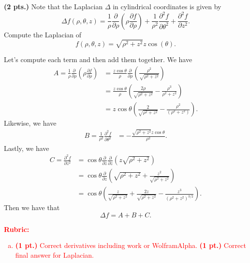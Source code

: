 \documentclass[12pt]{article} %
\begin{document}
\newpage
\begin{problem}
	\textbf{(2 pts.)} Note that the Laplacian $\Delta$ in cylindrical coordinates is given by
	\[
	\Delta f(\rho,\theta,z) = \frac{1}{\rho} \frac{\partial}{\partial \rho} \left(\rho \frac{\partial f}{\partial \rho}\right)+\frac{1}{\rho^2}\frac{\partial^2 f}{\partial \theta^2} + \frac{\partial^2 f}{\partial z^2}.
	\]
	Compute the Laplacian of
	\[
	f(\rho,\theta,z) = \sqrt{\rho^2+z^2} z \cos(\theta).
	\]
\end{problem}
\begin{solution}
Let's compute each term and then add them together. We have
\begin{align*}
    A=\frac{1}{\rho}\frac{\partial}{\partial \rho} \left(\rho \frac{\partial f}{\partial \rho} \right) &=  \frac{z\cos \theta}{\rho} \frac{\partial}{\partial \rho} \left( \frac{\rho^2}{\sqrt{\rho^2+z^2}} \right)\\
    &=\frac{z\cos \theta}{\rho} \left(\frac{2\rho}{\sqrt{\rho^2+z^2}}-\frac{\rho^3}{\rho^2+z^2}\right)\\
    &= z\cos \theta \left( \frac{2}{\sqrt{\rho^2+z^2}} - \frac{\rho^2}{\left(\rho^2+z^2\right)}\right).
\end{align*}
Likewise, we have
\begin{align*}
    B=\frac{1}{\rho^2} \frac{\partial^2 f}{\partial \theta^2} &= -\frac{\sqrt{\rho^2+z^2}z\cos\theta}{\rho^2}.
\end{align*}  
Lastly, we have
\begin{align*}
    C=\frac{\partial^2 f}{\partial z^2} &= \cos \theta \frac{\partial}{\partial z}\frac{\partial}{\partial z} \left( z \sqrt{\rho^2+z^2}\right)\\
    &= \cos \theta \frac{\partial}{\partial z} \left( \sqrt{\rho^2+z^2}+ \frac{z^2}{\sqrt{\rho^2+z^2}}\right)\\
    &= \cos \theta \left(\frac{z}{\sqrt{\rho^2+z^2}}+\frac{2z}{\sqrt{\rho^2+z^2}}-\frac{z^3}{\left(\rho^2+z^2\right)^{3/2}}\right).
\end{align*}
Then we have that
\[
\Delta f = A+B+C.
\]
\end{solution}
\vspace*{1cm}
\textcolor{red}{
\noindent \textbf{Rubric:}
\begin{enumerate}[(a)]
    \item \textbf{(1 pt.)} Correct derivatives including work or WolframAlpha. \textbf{(1 pt.)} Correct final answer for Laplacian.
\end{enumerate}
}
\end{document}
